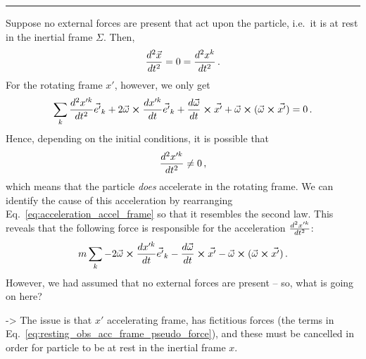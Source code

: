 \documentclass[../class_mech_main.tex]{subfiles}
\begin{document}
\hrule




Suppose no external forces are present that act upon the particle, i.e.~it is at rest in the inertial frame $\Sigma$. Then,
\begin{equation*}
	\dv[2]{\vec{x}}{t} = 0 = \dv[2]{x^k}{t} \, .
\end{equation*}
For the rotating frame $x'$, however, we only get
\begin{equation*}
	 \sum_k \dv[2]{x'^k}{t} \vec{e'}_k + 2 \vec{\omega} \cross \dv{x'^k}{t} \vec{e'}_k + \dv{\vec{\omega}}{t} \cross \vec{x'} + \vec{\omega} \cross (\vec{\omega} \cross \vec{x'}) = 0 \, .
\end{equation*}
Hence, depending on the initial conditions, it is possible that
\begin{equation}
	\dv[2]{x'^k}{t} \neq 0 \, ,
\end{equation}
which means that the particle \emph{does} accelerate in the rotating frame.  We can identify the cause of this acceleration by rearranging Eq.~\eqref{eq:acceleration_accel_frame} so that it resembles the second law. This reveals that the following force is responsible for the acceleration $\dv[2]{x'^k}{t}$:
\begin{equation}\label{eq:resting_obs_acc_frame_pseudo_force}
	m \sum_k - 2 \vec{\omega} \cross \dv{x'^k}{t} \vec{e'}_k - \dv{\vec{\omega}}{t} \cross \vec{x'} - \vec{\omega} \cross (\vec{\omega} \cross \vec{x'}) \, .
\end{equation}
However, we had assumed that no external forces are present -- so, what is going on here?

-> The issue is that $x'$ accelerating frame, has fictitious forces (the terms in Eq.~\eqref{eq:resting_obs_acc_frame_pseudo_force}), and these must be cancelled in order for particle to be at rest in the inertial frame $x$.
\end{document}
